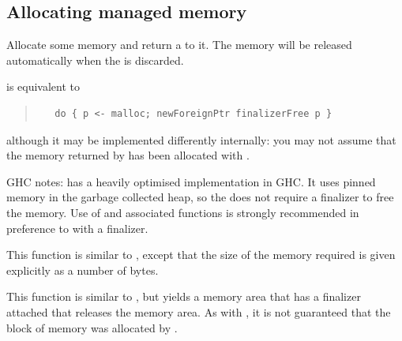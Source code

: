 \subsection{Allocating managed memory}
\begin{haddockdesc}
\item[\begin{tabular}{@{}l}
mallocForeignPtr :: Storable a => IO (ForeignPtr a)
\end{tabular}]
{\haddockbegindoc
Allocate some memory and return a  to it.  The memory
 will be released automatically when the  is discarded.\par
{} is equivalent to\par
\begin{quote}
{\haddockverb\begin{verbatim}
   do { p <- malloc; newForeignPtr finalizerFree p }\end{verbatim}}
\end{quote}
although it may be implemented differently internally: you may not
 assume that the memory returned by  has been
 allocated with .\par
GHC notes:  has a heavily optimised
 implementation in GHC.  It uses pinned memory in the garbage
 collected heap, so the  does not require a finalizer to
 free the memory.  Use of  and associated
 functions is strongly recommended in preference to
  with a finalizer.\par}
\end{haddockdesc}
\begin{haddockdesc}
\item[\begin{tabular}{@{}l}
mallocForeignPtrBytes :: Int -> IO (ForeignPtr a)
\end{tabular}]
{\haddockbegindoc
This function is similar to , except that the
 size of the memory required is given explicitly as a number of bytes.\par}
\end{haddockdesc}
\begin{haddockdesc}
\item[\begin{tabular}{@{}l}
mallocForeignPtrArray :: Storable a => Int -> IO (ForeignPtr a)
\end{tabular}]
{\haddockbegindoc
This function is similar to ,
 but yields a memory area that has a finalizer attached that releases
 the memory area.  As with , it is not guaranteed that
 the block of memory was allocated by .\par}
\end{haddockdesc}
